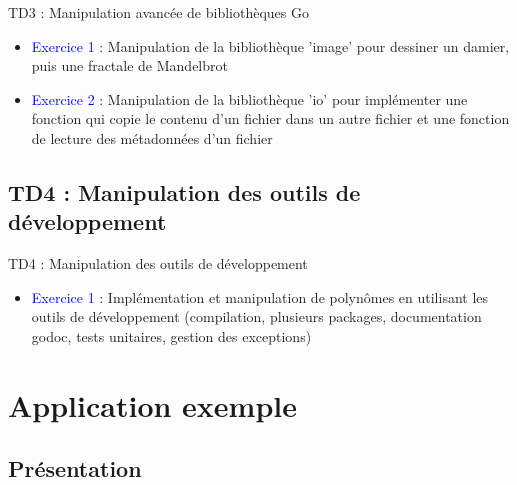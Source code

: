 \documentclass{beamer}
\begin{document}
\begin{frame}
\begin{block}{TD3 : Manipulation avancée de bibliothèques Go} 
	\begin{itemize}
		[circle]
		\item \textcolor{blue}{Exercice 1} : Manipulation de la bibliothèque 'image' pour dessiner un damier, puis une fractale de Mandelbrot
		\item \textcolor{blue}{Exercice 2} : Manipulation de la bibliothèque 'io' pour implémenter une fonction qui copie le contenu d'un fichier dans un autre fichier et une fonction de lecture des métadonnées d'un fichier
	\end{itemize}
\end{block}
\end{frame}

\subsection{TD4 : Manipulation des outils de développement}

\begin{frame}
\begin{block}{TD4 : Manipulation des outils de développement} 
	\begin{itemize}
		[circle]
		\item \textcolor{blue}{Exercice 1} : Implémentation et manipulation de polynômes en utilisant les outils de développement (compilation, plusieurs packages, documentation godoc, tests unitaires, gestion des exceptions)
	\end{itemize}
\end{block}
\end{frame}

\section{Application exemple}

\subsection{Présentation}
\end{document}
